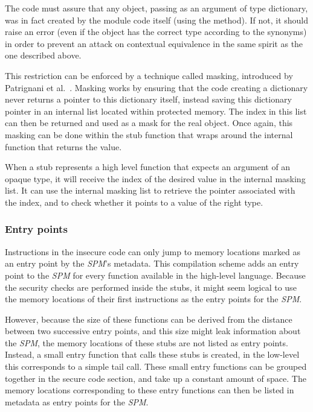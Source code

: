 The code must assure that any object, passing as an argument of type dictionary, was in fact created by the module code itself (using the  method). If not, it should raise an error (even if the object has the correct type according to the synonyms) in order to prevent an attack on contextual equivalence in the same spirit as the one described above.

This restriction can be enforced by a technique called masking, introduced by Patrignani et al.~\cite{Patrignani}. 
Masking works by ensuring that the code creating a dictionary never returns a pointer to this dictionary itself, instead saving this dictionary pointer in an internal list located within protected memory.
The index in this list can then be returned and used as a mask for the real object.
Once again, this masking can be done within the stub function that wraps around the internal function that returns the value.

When a stub represents a high level function that expects an argument of an opaque type, it will receive the index of the desired value in the internal masking list.
It can use the internal masking list to retrieve the pointer associated with the index, and to check whether it points to a value of the right type.
%


\subsubsection{Entry points}
Instructions in the insecure code can only jump to memory locations marked as an entry point by the \emph{SPM}'s metadata.
This compilation scheme adds an entry point to the \emph{SPM} for every function available in the high-level language.
Because the security checks are performed inside the stubs, it might seem logical to use the memory locations of their first instructions as the entry points for the \emph{SPM}.

However, because the size of these functions can be derived from the distance between two successive entry points, and this size might leak information about the \emph{SPM}, the memory locations of these stubs are not listed as entry points.
Instead, a small entry function that calls these stubs is created, in the low-level this corresponds to a simple tail call.
These small entry functions can be grouped together in the secure code section, and take up a constant amount of space.
The memory locations corresponding to these entry functions can then be listed in metadata as entry points for the \emph{SPM}.

